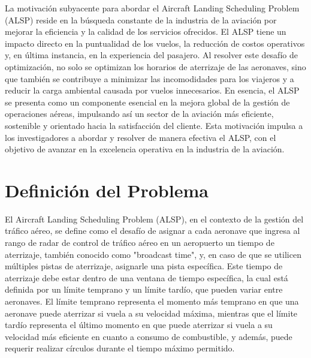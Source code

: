 \documentclass[letter, 10pt]{article}
\begin{document}
La motivaci\'on subyacente para abordar el Aircraft Landing Scheduling Problem (ALSP) reside en la b\'usqueda constante de la industria de la aviaci\'on por mejorar la eficiencia y la calidad de los servicios ofrecidos. El ALSP tiene un impacto directo en la puntualidad de los vuelos, la reducci\'on de costos operativos y, en \'ultima instancia, en la experiencia del pasajero. Al resolver este desaf\'io de optimizaci\'on, no solo se optimizan los horarios de aterrizaje de las aeronaves, sino que tambi\'en se contribuye a minimizar las incomodidades para los viajeros y a reducir la carga ambiental causada por vuelos innecesarios. En esencia, el ALSP se presenta como un componente esencial en la mejora global de la gesti\'on de operaciones a\'ereas, impulsando as\'i un sector de la aviaci\'on m\'as eficiente, sostenible y orientado hacia la satisfacci\'on del cliente. Esta motivaci\'on impulsa a los investigadores a abordar y resolver de manera efectiva el ALSP, con el objetivo de avanzar en la excelencia operativa en la industria de la aviaci\'on.

\section{Definici\'on del Problema}
El Aircraft Landing Scheduling Problem (ALSP), en el contexto de la gesti\'on del tr\'afico a\'ereo, se define como el desaf\'io de asignar a cada aeronave que ingresa al rango de radar de control de tr\'afico a\'ereo en un aeropuerto un tiempo de aterrizaje, tambi\'en conocido como "broadcast time", y, en caso de que se utilicen m\'ultiples pistas de aterrizaje, asignarle una pista espec\'ifica. Este tiempo de aterrizaje debe estar dentro de una ventana de tiempo espec\'ifica, la cual est\'a definida por un l\'imite temprano y un l\'imite tard\'io, que pueden variar entre aeronaves. El l\'imite temprano representa el momento m\'as temprano en que una aeronave puede aterrizar si vuela a su velocidad m\'axima, mientras que el l\'imite tard\'io representa el \'ultimo momento en que puede aterrizar si vuela a su velocidad m\'as eficiente en cuanto a consumo de combustible, y adem\'as, puede requerir realizar c\'irculos durante el tiempo m\'aximo permitido. \\
\end{document}
